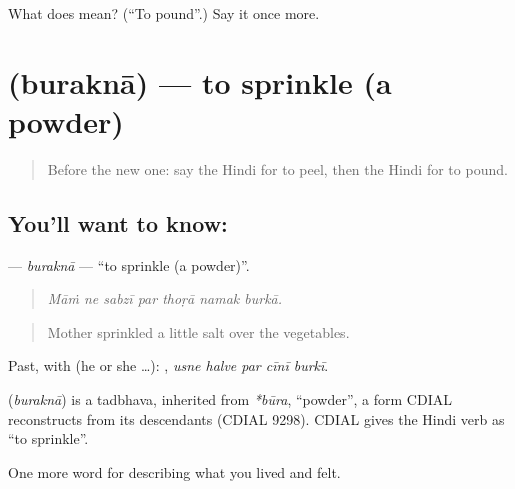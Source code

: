 \begin{tcolorbox}[breakable,colback=teal!4,colframe=teal!35!black,title={Before you move on}]
What does  mean? (\textquotedblleft{}To pound\textquotedblright{}.) Say it once more.
\end{tcolorbox}
\section[\texorpdfstring{\hi{बुरकना} (buraknā)}{बुरकना (buraknā)}]{ (buraknā) — to sprinkle (a powder)}

\label{lesson:HI-C523-burakna}



\begin{quote}
Before the new one: say the Hindi for to peel, then the Hindi for to pound.
\end{quote}

\subsection*{You'll want to know: }
\textbf{} — \emph{buraknā} — \textquotedblleft{}to sprinkle (a powder)\textquotedblright{}.

\begin{quote}
      
\end{quote}

\begin{quote}
\emph{Māṁ ne sabzī par thoṛā namak burkā.}
\end{quote}

\begin{quote}
Mother sprinkled a little salt over the vegetables.
\end{quote}

Past, with  (he or she …):     , \emph{usne halve par cīnī burkī}.

\begin{cousinweb}
\textbf{} (\emph{buraknā}) is a tadbhava, inherited from \emph{*būra}, \textquotedblleft{}powder\textquotedblright{}, a form CDIAL reconstructs from its descendants (CDIAL 9298). CDIAL gives the Hindi verb as \textquotedblleft{}to sprinkle\textquotedblright{}.
\end{cousinweb}

\begin{grammarlens}[title={What you've built}]
One more word for describing what you lived and felt.
\end{grammarlens}

